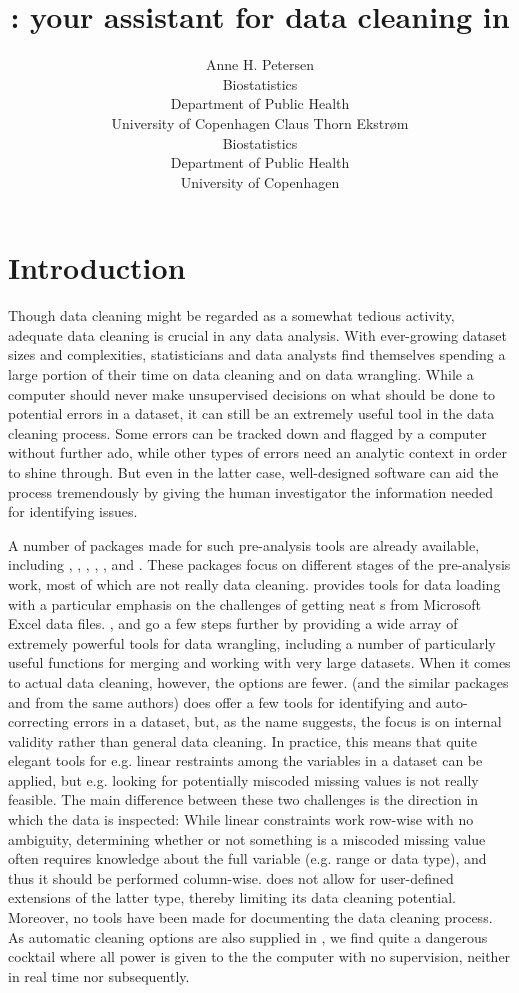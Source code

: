 \documentclass[article,shortnames]{jss}
\author{Anne H. Petersen\\Biostatistics\\Department of Public
  Health\\University of Copenhagen \And Claus Thorn Ekstr\o m\\Biostatistics\\Department of Public
  Health\\University of Copenhagen}
\title{\pkg{dataMaid}: your assistant for data cleaning in \proglang{R}}
\begin{document}
\section{Introduction}
Though data cleaning might be regarded as a somewhat tedious activity,
adequate data cleaning is crucial in any data analysis. With
ever-growing dataset sizes and complexities, statisticians and data
analysts find themselves spending a large portion of their time on
data cleaning and on data wrangling. While a computer should never
make unsupervised decisions on what should be done to potential
errors in a dataset, it can still be an extremely useful tool in the
data cleaning process. Some errors can be tracked down and flagged by a
computer without further ado, while other types of errors need an analytic
context in order to shine through. But even in the latter case, well-designed
software can aid the process tremendously by giving the human investigator the
information needed for identifying issues.

A number of  packages made for such pre-analysis tools are already 
available, including  \citep{janitor}, 
 \citep{plyr},  \citep{data.table}, 
 \citep{DataCombine} ,  \citep{validate}, and
 \citep{DataExplorer}. These packages focus on different 
stages of the pre-analysis work, most of which are not really data cleaning.
 provides tools for data loading with a
particular emphasis on the challenges of getting neat s from 
Microsoft Excel data files. ,  and  go a few
steps further by providing a wide array of extremely powerful tools for data wrangling, 
including a number of particularly useful functions for merging and working with
very large datasets. When it comes to actual data cleaning, however, the options are fewer.
 (and the similar packages  and  from the same 
authors) does offer a few tools for identifying and auto-correcting errors in a dataset, 
but, as the name suggests, the focus is on internal validity rather than 
general data cleaning. In practice, this means that quite elegant tools for e.g. linear 
restraints among the variables in a dataset can be applied, but e.g. looking for potentially
miscoded missing values is not really feasible. The main difference between these two challenges
is the direction in which the data is inspected: While linear constraints work row-wise
with no ambiguity, determining whether or not something is a miscoded missing value 
often requires knowledge about the full variable (e.g. range or data type), and thus
it should be performed column-wise.  does not allow for user-defined
extensions of the latter type, thereby limiting its data cleaning potential.
Moreover, no tools have been made for documenting the data cleaning process. 
As automatic cleaning options are also supplied in ,  
we find quite a dangerous cocktail where all power is given to the the computer 
with no supervision, neither in real time nor subsequently.  
\end{document}
